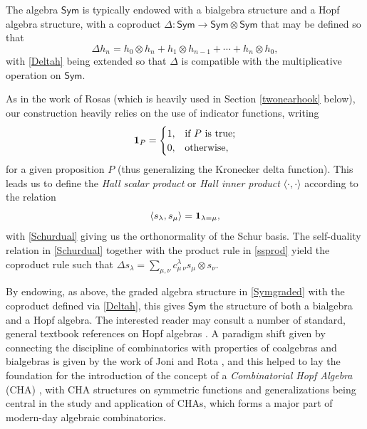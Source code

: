 \documentclass[12pt]{article}
\begin{document}
 The algebra $\textsf{Sym}$ is typically endowed with a bialgebra structure and a Hopf algebra structure, with a coproduct 
 $\Delta\colon \textsf{Sym} \to \textsf{Sym} \otimes \textsf{Sym}$ that may be defined so that 
\begin{equation}\label{Deltah}
 \Delta h_{n} = h_{0} \otimes h_{n} + h_{1} \otimes h_{n-1} + \cdots + h_{n} \otimes h_{0}, 
\end{equation}
 with \eqref{Deltah} being extended so that $\Delta$ is compatible with the multiplicative operation on $\textsf{Sym}$. 

 As in the work of Rosas \cite{Rosas2001} (which is heavily used in Section \ref{twonearhook} below), our construction heavily relies on 
 the use of indicator functions, writing $$ \text{{\bf 1}}_{P} = \begin{cases} 1, & \text{if $P$ is true;} \\
 0, & \text{otherwise,} \end{cases} $$ for a given proposition $P$ (thus generalizing the Kronecker delta function). This leads us to define 
 the \emph{Hall scalar product} or \emph{Hall inner product} $\langle \cdot, \cdot \rangle$ 
 according to the relation 
\begin{equation}\label{Schurdual}
 \langle s_{\lambda}, s_{\mu} \rangle = \text{{\bf 1}}_{\lambda = \mu}, 
\end{equation}
 with \eqref{Schurdual} giving us the 
 orthonormality of the Schur basis. 
 The self-duality relation in \eqref{Schurdual} together with the product rule in 
 \eqref{ssprod} yield the coproduct rule such that 
 $ \Delta s_{\lambda} = \sum_{\mu, \nu} c_{\mu \, \nu}^{\lambda} s_{\mu} \otimes s_{\nu}$. 

 By endowing, as above, the graded algebra structure in \eqref{Symgraded} with the coproduct defined via \eqref{Deltah}, this gives
 $\textsf{Sym}$ the structure of both a bialgebra and a Hopf algebra. The interested reader may consult a number of standard, general 
 textbook references on Hopf algebras \cite{Abe1980,CartierPatras2021,Montgomery1993,Sweedler1969}. A paradigm shift given by 
 connecting the discipline of combinatorics with properties of coalgebras and bialgebras is given by the work of Joni and Rota 
 \cite{JoniRota1979}, and this helped to lay the foundation for the introduction of the concept of a \emph{Combinatorial Hopf 
 Algebra} (CHA) \cite{AguiarBergeronSottile2006}, with CHA structures on symmetric functions and generalizations being central 
 in the study and application of CHAs, which forms a major part of modern-day algebraic combinatorics. 
\end{document}
